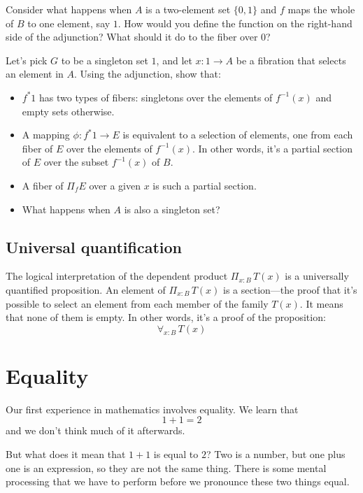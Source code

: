 \documentclass[DaoFP]{subfiles}
\begin{document}
\begin{exercise}
Consider what happens when $A$ is a two-element set $\{0, 1\}$ and $f$ maps the whole of $B$ to one element, say $1$. How would you define the function on the right-hand side of the adjunction? What should it do to the fiber over $0$?
\end{exercise}

\begin{exercise}
Let's pick $G$ to be a singleton set $1$, and let $x \colon 1 \to A$ be a fibration that selects an element in $A$. Using the adjunction, show that:
\begin{itemize}
\item $f^* 1$ has two types of fibers: singletons over the elements of $f^{-1} (x)$ and empty sets otherwise. 
\item A mapping $\phi \colon f^* 1 \to E$ is equivalent to a selection of elements, one from each fiber of $E$ over the elements of $f^{-1}(x)$. In other words, it's a partial section of $E$ over the subset $f^{-1}(x)$ of $B$.
\item A fiber of $\Pi_f E$ over a given $x$ is such a partial section. 
\item What happens when $A$ is also a singleton set?
\end{itemize}
\end{exercise}



\subsection{Universal quantification}

The logical interpretation of the dependent product $\Pi_{x : B} \, T(x)$ is a universally quantified proposition. An element of $\Pi_{x : B} \, T(x)$ is a section---the proof that it's possible to select an element from each member of the family $T(x)$. It means that none of them is empty. In other words, it's a proof of the proposition:
\[ \forall_{x : B}\, T(x) \]

\section{Equality}

Our first experience in mathematics involves equality. We learn that 
\[1+1=2\] 
and we don't think much of it afterwards. 

But what does it mean that $1+1$ is equal to $2$? Two is a number, but one plus one is an expression, so they are not the same thing. There is some mental processing that we have to perform before we pronounce these two things equal. 
\end{document}
